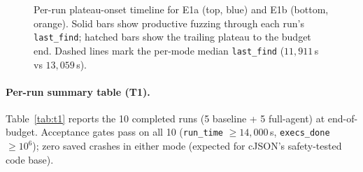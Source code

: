 \documentclass[11pt]{article}
\begin{document}
\begin{figure}[t]
  \centering
  \resizebox{\textwidth}{!}{}
  \caption{Per-run plateau-onset timeline for E1a (top, blue) and
  E1b (bottom, orange). Solid bars show productive fuzzing through
  each run's \texttt{last\_find}; hatched bars show the trailing
  plateau to the budget end. Dashed lines mark the per-mode median
  \texttt{last\_find} ($11{,}911$\,s vs $13{,}059$\,s).}
  \label{fig:plateau-timeline}
\end{figure}

\paragraph{Per-run summary table (T1).}
Table~\ref{tab:t1} reports the 10 completed runs (5 baseline + 5
full-agent) at end-of-budget. Acceptance gates pass on all 10
(\texttt{run\_time} $\geq 14{,}000$\,s,
\texttt{execs\_done} $\geq 10^6$); zero saved crashes in either
mode (expected for cJSON's safety-tested code base).
\end{document}
